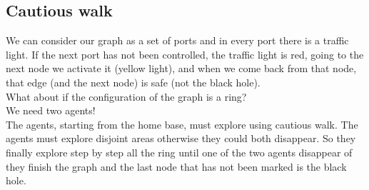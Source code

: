 \documentclass[paper=a4, fontsize=11pt]{scrartcl} %
\numberwithin{equation}{section} %
\numberwithin{figure}{section} %
\numberwithin{table}{section} %
\begin{document}
\subsection*{Cautious walk}
We can consider our graph as a set of ports and in every port there is a traffic light. If the next port has not been controlled, the traffic light is red, going to the next node we activate it (yellow light), and when we come back from that node, that edge (and the next node) is safe (not the black hole). \\
What about if the configuration of the graph is a ring?\\
We need two agents! \\
The agents, starting from the home base, must explore using cautious walk. The agents must explore disjoint areas otherwise they could both disappear. So they finally explore step by step all the ring until one of the two agents disappear of they finish the graph and the last node that has not been marked is the black hole.
\end{document}
